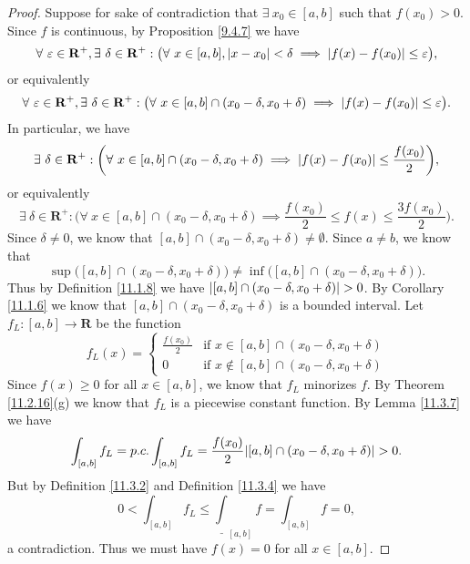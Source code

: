 \begin{proof}
    Suppose for sake of contradiction that \(\exists\ x_0 \in [a, b]\) such that \(f(x_0) > 0\).
    Since \(f\) is continuous, by Proposition \ref{9.4.7} we have
    \[
        \forall\ \varepsilon \in \mathbf{R}^+, \exists\ \delta \in \mathbf{R}^+ : \big(\forall\ x \in [a, b], \abs*{x - x_0} < \delta \implies \abs*{f(x) - f(x_0)} \leq \varepsilon\big),
    \]
    or equivalently
    \[
        \forall\ \varepsilon \in \mathbf{R}^+, \exists\ \delta \in \mathbf{R}^+ : \big(\forall\ x \in [a, b] \cap (x_0 - \delta, x_0 + \delta) \implies \abs*{f(x) - f(x_0)} \leq \varepsilon\big).
    \]
    In particular, we have
    \[
        \exists\ \delta \in \mathbf{R}^+ : \bigg(\forall\ x \in [a, b] \cap (x_0 - \delta, x_0 + \delta) \implies \abs*{f(x) - f(x_0)} \leq \frac{f(x_0)}{2}\bigg),
    \]
    or equivalently
    \[
        \exists\ \delta \in \mathbf{R}^+ : \bigg(\forall\ x \in [a, b] \cap (x_0 - \delta, x_0 + \delta) \implies \frac{f(x_0)}{2} \leq f(x) \leq \frac{3 f(x_0)}{2}\bigg).
    \]
    Since \(\delta \neq 0\), we know that \([a, b] \cap (x_0 - \delta, x_0 + \delta) \neq \emptyset\).
    Since \(a \neq b\), we know that
    \[
        \sup\big([a, b] \cap (x_0 - \delta, x_0 + \delta)\big) \neq \inf\big([a, b] \cap (x_0 - \delta, x_0 + \delta)\big).
    \]
    Thus by Definition \ref{11.1.8} we have \(\abs*{[a, b] \cap (x_0 - \delta, x_0 + \delta)} > 0\).
    By Corollary \ref{11.1.6} we know that \([a, b] \cap (x_0 - \delta, x_0 + \delta)\) is a bounded interval.
    Let \(f_L : [a, b] \to \mathbf{R}\) be the function
    \[
        f_L(x) = \begin{cases}
            \frac{f(x_0)}{2} & \text{if } x \in [a, b] \cap (x_0 - \delta, x_0 + \delta)    \\
            0                & \text{if } x \notin [a, b] \cap (x_0 - \delta, x_0 + \delta)
        \end{cases}
    \]
    Since \(f(x) \geq 0\) for all \(x \in [a, b]\), we know that \(f_L\) minorizes \(f\).
    By Theorem \ref{11.2.16}(g) we know that \(f_L\) is a piecewise constant function.
    By Lemma \ref{11.3.7} we have
    \[
        \int_{[a, b]} f_L = p.c. \int_{[a, b]} f_L = \frac{f(x_0)}{2}\abs*{[a, b] \cap (x_0 - \delta, x_0 + \delta)} > 0.
    \]
    But by Definition \ref{11.3.2} and Definition \ref{11.3.4} we have
    \[
        0 < \int_{[a, b]} f_L \leq \underline{\int}_{[a, b]} f = \int_{[a, b]} f = 0,
    \]
    a contradiction.
    Thus we must have \(f(x) = 0\) for all \(x \in [a, b]\).
\end{proof}

